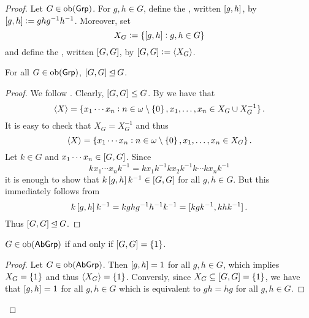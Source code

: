 \begin{proof}
	Let $G \in \operatorname{ob}(\mathsf{Grp})$. For $g,h \in G$, define the , written $\sbr[0]{g,h}$, by $\sbr[0]{g,h} := ghg^{-1}h^{-1}$. Moreover, set 
	\begin{equation*}
		X_G := \cbr[0]{\sbr[0]{g,h} : g,h \in G}
	\end{equation*}
	\noindent and define the , written $\sbr{G,G}$, by $\sbr{G,G} := \langle X_G \rangle$.

	\begin{lemma}
		For all $G \in \operatorname{ob}(\mathsf{Grp})$, $\sbr{G,G} \unlhd G$.
	\end{lemma}

	\begin{proof}
		We follow \cite[265]{lee:topological_manifolds:2011}. Clearly, $\sbr{G,G} \leq G$. By \cite[31]{karpfinger:algebra:2013} we have that 
	\begin{equation*}
		\langle X \rangle = \cbr[0]{x_1 \cdots x_n : n \in \omega \setminus \cbr{0}, x_1,\dots,x_n \in X_G \cup X^{-1}_G}.
	\end{equation*}
	It is easy to check that $X_G = X_G^{-1}$ and thus 
	\begin{equation*}
		\langle X \rangle = \cbr[0]{x_1 \cdots x_n : n \in \omega \setminus \cbr{0}, x_1,\dots,x_n \in X_G}.
	\end{equation*}
	Let $k \in G$ and $x_1 \cdots x_n \in \sbr{G,G}$. Since
	\begin{equation*}
		kx_1 \cdots x_n k^{-1} = kx_1 k^{-1} k x_2 k^{-1} k \cdots k x_n k^{-1}
	\end{equation*}
	\noindent it is enough to show that $k\sbr[0]{g,h}k^{-1} \in \sbr{G,G}$ for all $g,h \in G$. But this immediately follows from
	\begin{equation*}
		k\sbr[0]{g,h}k^{-1} = kghg^{-1}h^{-1}k^{-1} = \sbr[0]{kgk^{-1},khk^{-1}}.
	\end{equation*}
	Thus $\sbr{G,G} \unlhd G$.
	\end{proof}

	\begin{lemma}
		$G \in \operatorname{ob}(\mathsf{AbGrp})$ if and only if $\sbr{G,G} = \cbr{1}$.
		\label{lem:abelian_iff_commutator_trivial}
	\end{lemma}

	\begin{proof}
		Let $G \in \operatorname{ob}(\mathsf{AbGrp})$. Then $\sbr[0]{g,h} = 1$ for all $g,h \in G$, which implies $X_G = \cbr{1}$ and thus $\langle X_G \rangle = \cbr{1}$. Conversly, since $X_G \subseteq \sbr{G,G} = \cbr{1}$, we have that $\sbr[0]{g,h} = 1$ for all $g,h \in G$ which is equivalent to $gh = hg$ for all $g,h \in G$.	
	\end{proof}


\end{proof}

